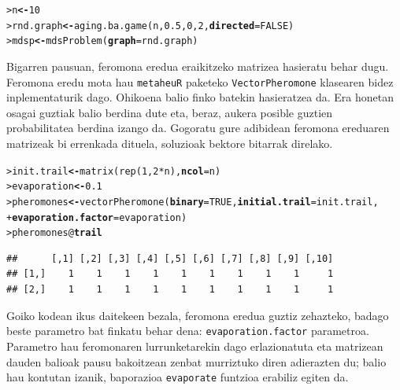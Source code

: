\documentclass[eu]{ifirak}\usepackage[]{graphicx}\usepackage[]{color}
\makeatletter
\newcommand{\hlnum}[1]{\textcolor[rgb]{0.659,0.4,0.051}{#1}}%
\newcommand{\hlopt}[1]{\textcolor[rgb]{0,0,0}{#1}}%
\newcommand{\hlstd}[1]{\textcolor[rgb]{0,0,0}{#1}}%
\newcommand{\hlkwb}[1]{\textcolor[rgb]{0.549,0.114,0.412}{\textbf{#1}}}%
\newcommand{\hlkwc}[1]{\textcolor[rgb]{0.659,0.573,0.133}{\textbf{#1}}}%
\newcommand{\hlkwd}[1]{\textcolor[rgb]{0.659,0.133,0.482}{#1}}%
\newenvironment{kframe}{%
 \def\at@end@of@kframe{}%
 \ifinner\ifhmode%
  \def\at@end@of@kframe{\end{minipage}}%
  \begin{minipage}{\columnwidth}%
 \fi\fi%
 \def\FrameCommand##1{\hskip\@totalleftmargin \hskip-\fboxsep
 \colorbox{shadecolor}{##1}\hskip-\fboxsep
     \hskip-\linewidth \hskip-\@totalleftmargin \hskip\columnwidth}%
 \MakeFramed {\advance\hsize-\width
   \@totalleftmargin\z@ \linewidth\hsize
   \@setminipage}}%
 {\par\unskip\endMakeFramed%
 \at@end@of@kframe}
\newenvironment{knitrout}{}{} %
\newcommand{\code}[1]{\texttt{#1}}
\makeatother
\begin{document}
\begin{knitrout}
\color{fgcolor}\begin{kframe}
\begin{alltt}
\hlstd{> }\hlstd{n} \hlkwb{<-} \hlnum{10}
\hlstd{> }\hlstd{rnd.graph} \hlkwb{<-} \hlkwd{aging.ba.game} \hlstd{(n,} \hlnum{0.5}\hlstd{,} \hlnum{0}\hlstd{,} \hlnum{2}\hlstd{,} \hlkwc{directed}\hlstd{=}\hlnum{FALSE}\hlstd{)}
\hlstd{> }\hlstd{mdsp} \hlkwb{<-} \hlkwd{mdsProblem}\hlstd{(}\hlkwc{graph}\hlstd{=rnd.graph)}
\end{alltt}
\end{kframe}
\end{knitrout}

Bigarren pausuan, feromona eredua eraikitzeko matrizea hasieratu behar dugu. Feromona eredu mota hau \code{metaheuR} paketeko \code{VectorPheromone} klasearen bidez inplementaturik dago. Ohikoena balio finko batekin hasieratzea da. Era honetan osagai guztiak balio berdina dute eta, beraz, aukera posible guztien probabilitatea berdina izango da. Gogoratu gure adibidean feromona ereduaren matrizeak bi errenkada dituela, soluzioak bektore bitarrak direlako.

\begin{knitrout}
\color{fgcolor}\begin{kframe}
\begin{alltt}
\hlstd{> }\hlstd{init.trail} \hlkwb{<-} \hlkwd{matrix} \hlstd{(}\hlkwd{rep}\hlstd{(}\hlnum{1}\hlstd{,} \hlnum{2}\hlopt{*}\hlstd{n),} \hlkwc{ncol}\hlstd{=n)}
\hlstd{> }\hlstd{evaporation} \hlkwb{<-} \hlnum{0.1}
\hlstd{> }\hlstd{pheromones} \hlkwb{<-} \hlkwd{vectorPheromone}\hlstd{(}\hlkwc{binary}\hlstd{=}\hlnum{TRUE}\hlstd{,} \hlkwc{initial.trail}\hlstd{=init.trail,}
\hlstd{+ }                              \hlkwc{evaporation.factor}\hlstd{=evaporation)}
\hlstd{> }\hlstd{pheromones}\hlopt{@}\hlkwc{trail}
\end{alltt}
\begin{verbatim}
##      [,1] [,2] [,3] [,4] [,5] [,6] [,7] [,8] [,9] [,10]
## [1,]    1    1    1    1    1    1    1    1    1     1
## [2,]    1    1    1    1    1    1    1    1    1     1
\end{verbatim}
\end{kframe}
\end{knitrout}

Goiko kodean ikus daitekeen bezala, feromona eredua guztiz zehazteko, badago beste parametro bat finkatu behar dena: \code{evaporation.factor} parametroa. Parametro hau feromonaren lurrunketarekin dago erlazionatuta eta matrizean dauden balioak pausu bakoitzean zenbat murriztuko diren adierazten du; balio hau kontutan izanik, baporazioa \code{evaporate} funtzioa erabiliz egiten da.
\end{document}
